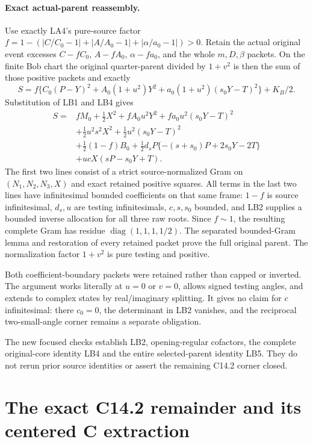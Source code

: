 \paragraph{Exact actual-parent reassembly.}
Use exactly LA4's pure-source factor
$f=1-(|C/C_0-1|+|A/A_0-1|+|\alpha/a_0-1|)>0$.
Retain the actual original event excesses
$C-fC_0$, $A-fA_0$, $\alpha-fa_0$, and the whole $m,D,\beta$
packets.  On the finite Bob chart the original quarter-parent divided
by $1+v^2$ is then the sum of those positive packets and exactly
\[
 S=f\{C_0(P-Y)^2+A_0(1+u^2)Y^2
                         +a_0(1+u^2)(s_0Y-T)^2\}+K_B/2.
\]
Substitution of LB1 and LB4 gives
\[
\begin{split}
 S={}&fM_0+\tfrac12X^2
       +fA_0u^2Y^2+fa_0u^2(s_0Y-T)^2\\
    &+\tfrac12u^2s^2X^2+\tfrac12u^2(s_0Y-T)^2\\
    &+\tfrac12(1-f)B_0
       +\tfrac12d_sP\{-(s+s_0)P+2s_0Y-2T\}\\
    &+ucX(sP-s_0Y+T).
\end{split} \tag{LB5}
\]
The first two lines consist of a strict source-normalized Gram on
$(N_1,N_2,N_3,X)$ and exact retained positive squares.  All terms
in the last two lines have infinitesimal bounded coefficients on
that same frame: $1-f$ is source infinitesimal, $d_s,u$ are testing
infinitesimals, $c,s,s_0$ bounded, and LB2 supplies a bounded inverse
allocation for all three raw roots.  Since $f\sim1$, the resulting
complete Gram has residue $\operatorname{diag}(1,1,1,1/2)$.
The separated bounded-Gram lemma and restoration of every retained
packet prove the full original parent.  The normalization factor
$1+v^2$ is pure testing and positive.

Both coefficient-boundary packets were retained rather than capped
or inverted.  The argument works literally at $u=0$ or $v=0$,
allows signed testing angles, and extends to complex states by
real/imaginary splitting.  It gives no claim for $c$ infinitesimal:
there $c_0=0$, the determinant in LB2 vanishes, and the reciprocal
two-small-angle corner remains a separate obligation.

The new focused checks establish LB2, opening-regular cofactors,
the complete original-core identity LB4 and the entire selected-parent
identity LB5.  They do not rerun prior source identities or assert
the remaining C14.2 corner closed.


\section{\texorpdfstring{The exact C14.2 remainder and its centered C extraction}{The exact C14.2 remainder and its centered C extraction}}
\label{component:p156da4167158}


